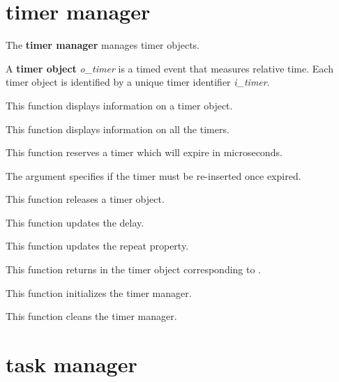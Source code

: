 %
%

\section{timer manager}

The \textbf{timer manager} manages timer objects.

A \textbf{timer object} \textit{o\_timer} is a timed event that measures
relative time. Each timer object is identified by a unique timer identifier
\textit{i\_timer}.

%
%

	 {
	   This function displays information on a timer object.
	 }

	 {
	   This function displays information on all the timers.
	 }

	 {
	   This function reserves a timer which will expire in
	    microseconds.

	   The  argument specifies if the timer
	   must be re-inserted once expired.
	 }

	 {
	   This function releases a timer object.
	 }

	 {
	   This function updates the delay.
	 }

	 {
	   This function updates the repeat property.
	 }

	 {
	   This function returns in  the timer object
	   corresponding to .
	 }

	 {
	   This function initializes the timer manager.
	 }

	 {
	   This function cleans the timer manager.
	 }

%
%

\section{task manager}

